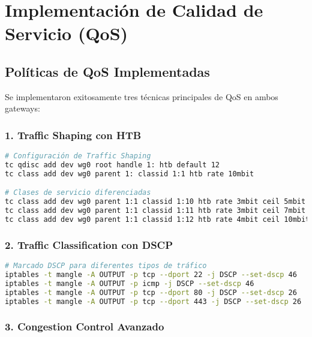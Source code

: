 \section{Implementación de Calidad de Servicio (QoS)}

\subsection{Políticas de QoS Implementadas}

Se implementaron exitosamente tres técnicas principales de QoS en ambos gateways:

\subsubsection{1. Traffic Shaping con HTB}

\begin{lstlisting}[language=bash, caption=Configuración Hierarchical Token Bucket]
# Configuración de Traffic Shaping
tc qdisc add dev wg0 root handle 1: htb default 12
tc class add dev wg0 parent 1: classid 1:1 htb rate 10mbit

# Clases de servicio diferenciadas
tc class add dev wg0 parent 1:1 classid 1:10 htb rate 3mbit ceil 5mbit   # Alta prioridad
tc class add dev wg0 parent 1:1 classid 1:11 htb rate 3mbit ceil 7mbit   # Media prioridad  
tc class add dev wg0 parent 1:1 classid 1:12 htb rate 4mbit ceil 10mbit  # Baja prioridad
\end{lstlisting}

\subsubsection{2. Traffic Classification con DSCP}

\begin{lstlisting}[language=bash, caption=Marcado DSCP para priorización]
# Marcado DSCP para diferentes tipos de tráfico
iptables -t mangle -A OUTPUT -p tcp --dport 22 -j DSCP --set-dscp 46    # SSH - Alta prioridad
iptables -t mangle -A OUTPUT -p icmp -j DSCP --set-dscp 46               # ICMP - Alta prioridad
iptables -t mangle -A OUTPUT -p tcp --dport 80 -j DSCP --set-dscp 26     # HTTP - Media prioridad
iptables -t mangle -A OUTPUT -p tcp --dport 443 -j DSCP --set-dscp 26    # HTTPS - Media prioridad
\end{lstlisting}

\subsubsection{3. Congestion Control Avanzado}

